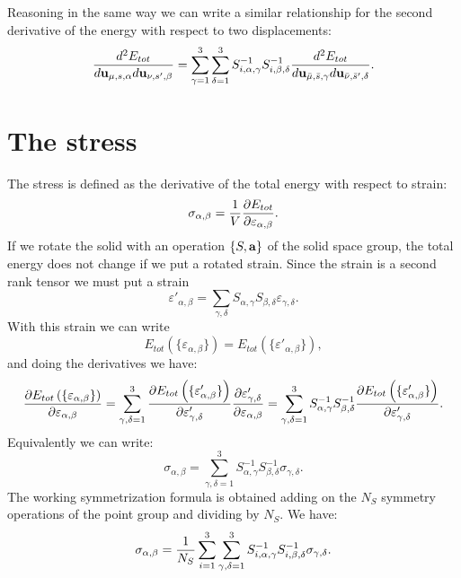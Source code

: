 \documentclass[12pt,a4paper,twoside]{report}
\begin{document}
Reasoning in the same way we can write a similar relationship for the second derivative of the energy with respect to two displacements:
\begin{equation}
{d^2 E_{tot} \over d {\bf u}_{\mu,s,\alpha} d {\bf u}_{\nu,s',\beta}} =
\sum_{\gamma=1}^3\sum_{\delta=1}^3  S^{-1}_{i,\alpha,\gamma} S^{-1}_{i,\beta,\delta}
{d^2 E_{tot} \over d {\bf u}_{{\bar \mu},{\bar s},\gamma}d {\bf u}_{{\bar \nu},{\bar s}',\delta} }.
\label{secondder}
\end{equation}

\section{The stress}
The stress is defined as the derivative of the total
energy with respect to strain:
\begin{equation}
\sigma_{\alpha,\beta} = {1\over V} {\partial E_{tot} \over \partial \varepsilon_{\alpha,\beta}}.
\end{equation}
If we rotate the solid with an operation $\{S,{\bf a}\}$ of the solid space group, the total energy does not change if we put a rotated strain. Since the strain is a second rank tensor we must put a strain
\begin{equation}
\varepsilon'_{\alpha,\beta}= \sum_{\gamma,\delta}S_{\alpha,\gamma} S_{\beta,\delta} \varepsilon_{\gamma,\delta}.
\end{equation}
With this strain we can write
\begin{equation}
E_{tot}\left(\{\varepsilon_{\alpha,\beta}\}\right) = 
E_{tot}\left(\{\varepsilon'_{\alpha,\beta}\}\right),
\end{equation}
and doing the derivatives we have:
\begin{equation}
{\partial E_{tot}\left(\{\varepsilon_{\alpha,\beta}\}\right) \over \partial \varepsilon_{\alpha,\beta}} =\sum_{\gamma,\delta=1}^3 {\partial 
E_{tot}\left(\{\varepsilon'_{\alpha,\beta}\}\right)
\over \partial \varepsilon'_{\gamma,\delta}} {\partial \varepsilon'_{\gamma,\delta} \over \partial \varepsilon_{\alpha,\beta}} = 
\sum_{\gamma,\delta=1}^3 S^{-1}_{\alpha,\gamma}
S^{-1}_{\beta,\delta}{\partial 
E_{tot}\left(\{\varepsilon'_{\alpha,\beta}\}\right)
\over \partial \varepsilon'_{\gamma,\delta}}. 
\end{equation}
Equivalently we can write:
\begin{equation}
\sigma_{\alpha,\beta}= 
\sum_{\gamma,\delta=1}^3 S^{-1}_{\alpha,\gamma}
S^{-1}_{\beta,\delta}
\sigma_{\gamma,\delta}.
\end{equation}
The working symmetrization formula is obtained adding on the $N_S$ symmetry operations of the point group
and dividing by $N_S$. We have:
\begin{equation}
\sigma_{\alpha,\beta}= {1 \over N_S} \sum_{i=1}^3
\sum_{\gamma,\delta=1}^3 S^{-1}_{i,\alpha,\gamma}
S^{-1}_{i,\beta,\delta}
\sigma_{\gamma,\delta}.
\label{symstress}
\end{equation}
\end{document}

